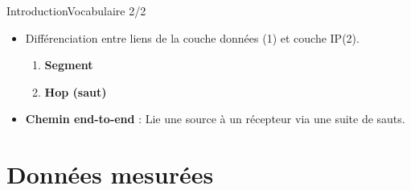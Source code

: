 \documentclass[compress]{beamer}
\begin{document}
\begin{frame}{Introduction}{Vocabulaire 2/2}
\begin{itemize}
	\item Différenciation entre liens de la couche données (1) et couche IP(2).
	\begin{enumerate}
		\item \textbf{Segment} %
		\item \textbf{Hop (saut)} %
	\end{enumerate}
	\vspace{10pt}
	\item \textbf{Chemin end-to-end} : Lie une source à un récepteur via une suite de sauts.
	\vspace{10pt}
\end{itemize}
\end{frame}



\section{Données mesurées}
\end{document}
